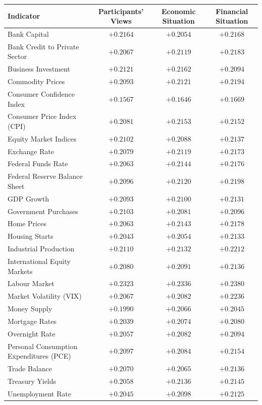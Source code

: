 \begin{tabular}{p{4.7cm}ccc}
\toprule
\textbf{Indicator} & \textbf{Participants' Views} & \textbf{Economic Situation} & \textbf{Financial Situation} \\
\midrule
Bank Capital & $+0.2164$ & $+0.2054$ & $+0.2168$ \\
Bank Credit to Private Sector & $+0.2067$ & $+0.2119$ & $+0.2183$ \\
Business Investment & $+0.2121$ & $+0.2162$ & $+0.2094$ \\
Commodity Prices & $+0.2093$ & $+0.2121$ & $+0.2194$ \\
Consumer Confidence Index & $+0.1567$ & $+0.1646$ & $+0.1669$ \\
Consumer Price Index (CPI) & $+0.2081$ & $+0.2153$ & $+0.2152$ \\
Equity Market Indices & $+0.2102$ & $+0.2088$ & $+0.2137$ \\
Exchange Rate & $+0.2079$ & $+0.2119$ & $+0.2173$ \\
Federal Funds Rate & $+0.2063$ & $+0.2144$ & $+0.2176$ \\
Federal Reserve Balance Sheet & $+0.2096$ & $+0.2120$ & $+0.2198$ \\
GDP Growth & $+0.2093$ & $+0.2100$ & $+0.2131$ \\
Government Purchases & $+0.2103$ & $+0.2081$ & $+0.2096$ \\
Home Prices & $+0.2063$ & $+0.2143$ & $+0.2178$ \\
Housing Starts & $+0.2043$ & $+0.2054$ & $+0.2133$ \\
Industrial Production & $+0.2110$ & $+0.2132$ & $+0.2212$ \\
International Equity Markets & $+0.2080$ & $+0.2091$ & $+0.2136$ \\
Labour Market & $+0.2323$ & $+0.2336$ & $+0.2380$ \\
Market Volatility (VIX) & $+0.2067$ & $+0.2082$ & $+0.2236$ \\
Money Supply & $+0.1990$ & $+0.2066$ & $+0.2045$ \\
Mortgage Rates & $+0.2039$ & $+0.2074$ & $+0.2080$ \\
Overnight Rate & $+0.2057$ & $+0.2082$ & $+0.2094$ \\
Personal Consumption Expenditures (PCE) & $+0.2097$ & $+0.2084$ & $+0.2154$ \\
Trade Balance & $+0.2070$ & $+0.2065$ & $+0.2136$ \\
Treasury Yields & $+0.2058$ & $+0.2136$ & $+0.2145$ \\
Unemployment Rate & $+0.2045$ & $+0.2098$ & $+0.2125$ \\
\bottomrule
\end{tabular}
